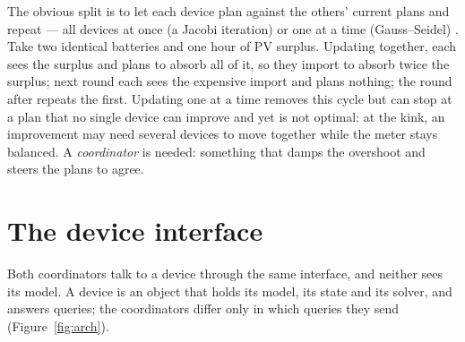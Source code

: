 \documentclass[11pt,a4paper]{article}
\begin{document}
The obvious split is to let each device plan against the others' current plans
and repeat --- all devices at once (a Jacobi iteration) or one at a time
(Gauss--Seidel) \cite{bertsekas1989}. Take two identical batteries and one hour
of PV surplus. Updating together, each sees the surplus and plans to absorb all
of it, so they import to absorb twice the surplus; next round each sees the
expensive import and plans nothing; the round after repeats the first. Updating
one at a time removes this cycle but can stop at a plan that no single device
can improve and yet is not optimal: at the kink, an improvement may need several
devices to move together while the meter stays balanced. A \emph{coordinator} is
needed: something that damps the overshoot and steers the plans to agree.

\section{The device interface}
\label{sec:interface}

Both coordinators talk to a device through the same interface, and neither sees
its model. A device is an object that holds its model, its state and its solver,
and answers queries; the coordinators differ only in which queries they send
(Figure~\ref{fig:arch}).
\end{document}
